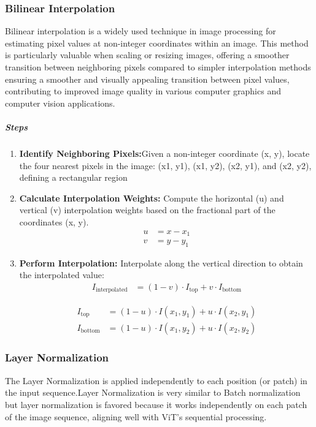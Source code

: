 \subsubsection{Bilinear Interpolation }
Bilinear interpolation is a widely used technique in image processing for estimating pixel values at non-integer coordinates within an image. This method is particularly valuable when scaling or resizing images, offering a smoother transition between neighboring pixels compared to simpler interpolation methods ensuring a smoother and visually appealing transition between pixel values, contributing to improved image quality in various computer graphics and computer vision applications.
\subparagraph{Steps}
\begin{enumerate}
    \item \textbf{Identify Neighboring Pixels:}Given a non-integer coordinate (x, y), locate the four nearest pixels in the image: (x1, y1), (x1, y2), (x2, y1), and (x2, y2), defining a rectangular region

    \item \textbf{Calculate Interpolation Weights:} Compute the horizontal (u) and vertical (v) interpolation weights based on the fractional part of the coordinates (x, y).
          \begin{align}
              u & = x - x_1 \label{eq:u_equation} \\
              v & = y - y_1 \label{eq:v_equation}
          \end{align}


    \item \textbf{Perform Interpolation:} Interpolate along the vertical direction to obtain the interpolated value:
          \begin{align}
              I_{\text{interpolated}} & = (1 - v) \cdot I_{\text{top}} + v \cdot I_{\text{bottom}} \label{eq:interpolated_equation}
          \end{align}


          \begin{align}
              I_{\text{top}}    & = (1 - u) \cdot I(x_1, y_1) + u \cdot I(x_2, y_1) \label{eq:itop_equation}    \\
              I_{\text{bottom}} & = (1 - u) \cdot I(x_1, y_2) + u \cdot I(x_2, y_2) \label{eq:ibottom_equation}
          \end{align}


\end{enumerate}
\subsubsection{Layer Normalization}
The Layer Normalization is applied independently to each position (or patch) in the input sequence.Layer Normalization is very similar to Batch normalization but layer normalization is favored because it works independently on each patch of the image sequence, aligning well with ViT's sequential processing.\\


